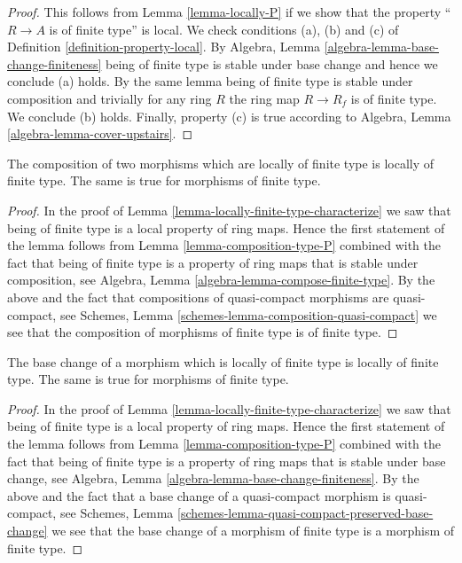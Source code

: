 \begin{proof}
This follows from Lemma \ref{lemma-locally-P} if we show that
the property ``$R \to A$ is of finite type'' is local.
We check conditions (a), (b) and (c) of Definition
\ref{definition-property-local}.
By Algebra, Lemma \ref{algebra-lemma-base-change-finiteness}
being of finite type is stable under base change and hence
we conclude (a) holds. By the same lemma being of finite type
is stable under composition and trivially for any ring
$R$ the ring map $R \to R_f$ is of finite type.
We conclude (b) holds. Finally, property (c) is true
according to Algebra, Lemma \ref{algebra-lemma-cover-upstairs}.
\end{proof}

\begin{lemma}
\label{lemma-composition-finite-type}
The composition of two morphisms which are locally of finite type is
locally of finite type. The same is true for morphisms of finite type.
\end{lemma}

\begin{proof}
In the proof of Lemma \ref{lemma-locally-finite-type-characterize}
we saw that being of finite type is a local property of ring maps.
Hence the first statement of the lemma follows from
Lemma \ref{lemma-composition-type-P} combined
with the fact that being of finite type is a property of ring maps that is
stable under composition, see
Algebra, Lemma \ref{algebra-lemma-compose-finite-type}.
By the above and the fact that compositions of
quasi-compact morphisms are quasi-compact, see
Schemes, Lemma \ref{schemes-lemma-composition-quasi-compact}
we see that the composition of morphisms of finite type is
of finite type.
\end{proof}

\begin{lemma}
\label{lemma-base-change-finite-type}
The base change of a morphism which is locally of finite type
is locally of finite type. The same is true for morphisms of
finite type.
\end{lemma}

\begin{proof}
In the proof of Lemma \ref{lemma-locally-finite-type-characterize}
we saw that being of finite type is a local property of ring maps.
Hence the first statement of the lemma follows from
Lemma \ref{lemma-composition-type-P} combined
with the fact that being of finite type is a property of ring maps that is
stable under base change, see
Algebra, Lemma \ref{algebra-lemma-base-change-finiteness}.
By the above and the fact that a base change of a
quasi-compact morphism is quasi-compact, see
Schemes, Lemma \ref{schemes-lemma-quasi-compact-preserved-base-change}
we see that the base change of a morphism of finite type is
a morphism of finite type.
\end{proof}

